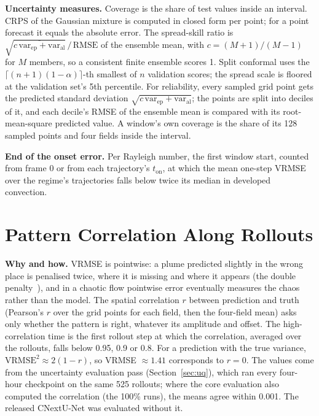 \documentclass[11pt]{article}
\begin{document}
\textbf{Uncertainty measures.} Coverage is the share of test values inside an interval. CRPS of the Gaussian mixture
is computed in closed form per point; for a point forecast it equals the absolute error. The spread-skill ratio is
$\sqrt{\overline{c\,\mathrm{var}_{\mathrm{ep}}+\mathrm{var}_{\mathrm{al}}}}\,/\,\mathrm{RMSE}$ of the ensemble mean,
with $c=(M+1)/(M-1)$ for $M$ members, so a consistent finite ensemble scores 1. Split conformal uses the
$\lceil (n+1)(1-\alpha)\rceil$-th smallest of $n$ validation scores; the spread scale is floored at the validation
set's 5th percentile. For reliability, every sampled grid point gets the predicted standard deviation
$\sqrt{c\,\mathrm{var}_{\mathrm{ep}}+\mathrm{var}_{\mathrm{al}}}$; the points are split into deciles of it, and each
decile's RMSE of the ensemble mean is compared with its root-mean-square predicted value. A window's own coverage is
the share of its 128 sampled points and four fields inside the interval.

\textbf{End of the onset error.} Per Rayleigh number, the first window start, counted from frame 0 or from each
trajectory's $t_{\mathrm{on}}$, at which the mean one-step VRMSE over the regime's trajectories falls below twice its
median in developed convection.

\section{Pattern Correlation Along Rollouts}
\label{app:correlation}

\textbf{Why and how.} VRMSE is pointwise: a plume predicted slightly in the wrong place is penalised twice, where it is
missing and where it appears (the double penalty~\cite{gilleland2009verification}), and in a chaotic flow pointwise
error eventually measures the chaos rather than the model. The spatial correlation $r$ between prediction and truth
(Pearson's $r$ over the grid points for each field, then the four-field mean) asks only whether the pattern is right,
whatever its amplitude and offset. The high-correlation time is the first rollout step at which the correlation,
averaged over the rollouts, falls below 0.95, 0.9 or 0.8. For a prediction with the true variance,
$\mathrm{VRMSE}^2\approx2(1-r)$, so VRMSE $\approx1.41$ corresponds to $r=0$. The values come from the
uncertainty evaluation pass (Section~\ref{sec:uq}), which ran every four-hour checkpoint on the same 525 rollouts;
where the core evaluation also computed the correlation (the 100\% runs), the means agree within 0.001. The released
CNextU-Net was evaluated without it.
\end{document}
